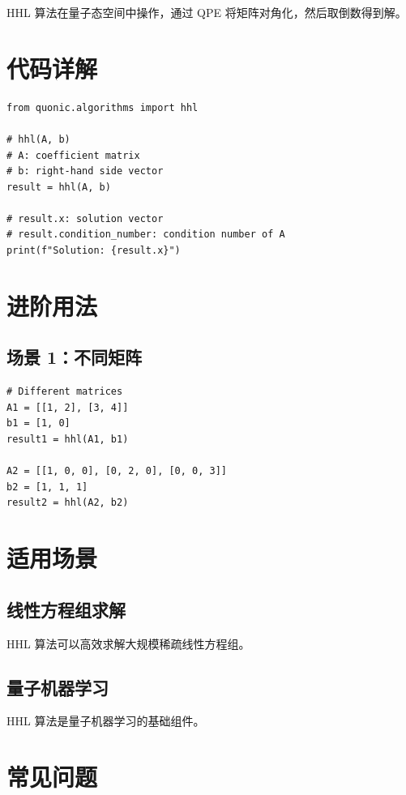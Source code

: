 \documentclass[12pt,a4paper]{article}
\begin{document}
HHL 算法在量子态空间中操作，通过 QPE 将矩阵对角化，然后取倒数得到解。

\section{代码详解}

\begin{lstlisting}[style=python]
from quonic.algorithms import hhl

# hhl(A, b)
# A: coefficient matrix
# b: right-hand side vector
result = hhl(A, b)

# result.x: solution vector
# result.condition_number: condition number of A
print(f"Solution: {result.x}")
\end{lstlisting}

\section{进阶用法}

\subsection{场景 1：不同矩阵}

\begin{lstlisting}[style=python]
# Different matrices
A1 = [[1, 2], [3, 4]]
b1 = [1, 0]
result1 = hhl(A1, b1)

A2 = [[1, 0, 0], [0, 2, 0], [0, 0, 3]]
b2 = [1, 1, 1]
result2 = hhl(A2, b2)
\end{lstlisting}

\section{适用场景}

\subsection{线性方程组求解}

HHL 算法可以高效求解大规模稀疏线性方程组。

\subsection{量子机器学习}

HHL 算法是量子机器学习的基础组件。

\section{常见问题}
\end{document}

